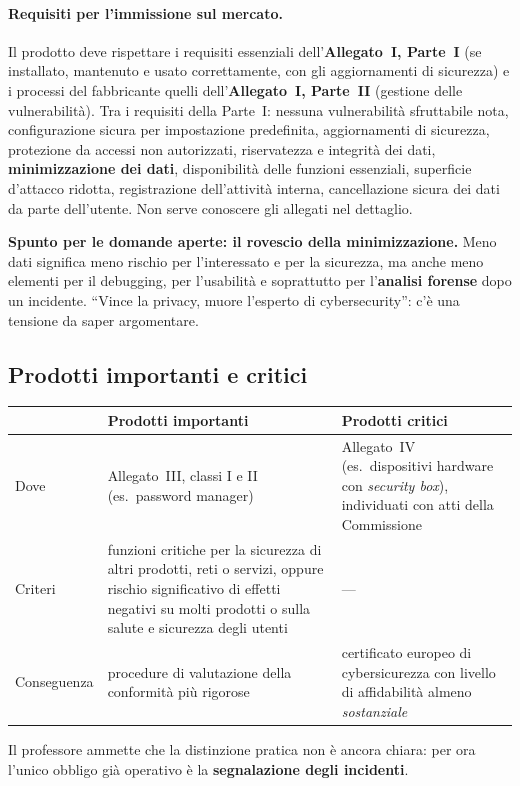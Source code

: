 \paragraph{Requisiti per l'immissione sul mercato.} Il prodotto deve rispettare i requisiti essenziali
dell'\textbf{Allegato~I, Parte~I} (se installato, mantenuto e usato correttamente, con gli aggiornamenti
di sicurezza) e i processi del fabbricante quelli dell'\textbf{Allegato~I, Parte~II} (gestione delle
vulnerabilità). Tra i requisiti della Parte~I: nessuna vulnerabilità sfruttabile nota, configurazione
sicura per impostazione predefinita, aggiornamenti di sicurezza, protezione da accessi non autorizzati,
riservatezza e integrità dei dati, \textbf{minimizzazione dei dati}, disponibilità delle funzioni
essenziali, superficie d'attacco ridotta, registrazione dell'attività interna, cancellazione sicura dei dati
da parte dell'utente. Non serve conoscere gli allegati nel dettaglio.

\begin{esame}
\textbf{Spunto per le domande aperte: il rovescio della minimizzazione.} Meno dati significa meno rischio
per l'interessato e per la sicurezza, ma anche meno elementi per il debugging, per l'usabilità e
soprattutto per l'\textbf{analisi forense} dopo un incidente. ``Vince la privacy, muore l'esperto di
cybersecurity'': c'è una tensione da saper argomentare.
\end{esame}

\subsection{Prodotti importanti e critici}
\begin{center}
\small
\begin{tabularx}{\linewidth}{>{\raggedright\arraybackslash}p{3.4cm} X X}
\toprule
& \textbf{Prodotti importanti} & \textbf{Prodotti critici} \\ \midrule
Dove & Allegato~III, classi I e II (es.\ password manager) & Allegato~IV (es.\ dispositivi hardware con
  \emph{security box}), individuati con atti della Commissione \\
Criteri & funzioni critiche per la sicurezza di altri prodotti, reti o servizi, oppure rischio
  significativo di effetti negativi su molti prodotti o sulla salute e sicurezza degli utenti & --- \\
Conseguenza & procedure di valutazione della conformità più rigorose & certificato europeo di
  cybersicurezza con livello di affidabilità almeno \emph{sostanziale} \\ \bottomrule
\end{tabularx}
\end{center}
Il professore ammette che la distinzione pratica non è ancora chiara: per ora l'unico obbligo già operativo
è la \textbf{segnalazione degli incidenti}.

